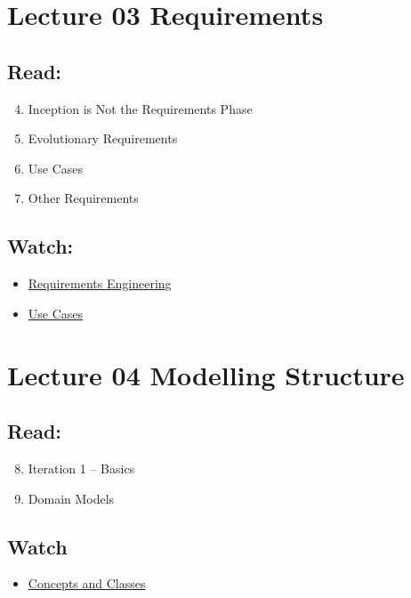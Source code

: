 \documentclass[10pt,t,a4paper]{article}
\begin{document}
\section{Lecture 03 Requirements}
\label{sec:orgheadline9}
\subsection{Read:}
\label{sec:orgheadline7}
\begin{enumerate}
\setcounter{enumi}{3}
\item Inception is Not the Requirements Phase
\item Evolutionary Requirements
\item Use Cases
\item Other Requirements
\end{enumerate}

\subsection{Watch:}
\label{sec:orgheadline8}
\begin{itemize}
\item \href{https://play.bth.se/media/Requirements+Engineering/1_epma2li8/41750261}{Requirements Engineering}
\item \href{https://play.bth.se/media/Use+Cases/1_d4tqygel/41750261}{Use Cases}
\end{itemize}
\section{Lecture 04 Modelling Structure}
\label{sec:orgheadline12}
\subsection{Read:}
\label{sec:orgheadline10}
\begin{enumerate}
\setcounter{enumi}{7}
\item Iteration 1 -- Basics
\item Domain Models
\end{enumerate}

\subsection{Watch}
\label{sec:orgheadline11}
\begin{itemize}
\item \href{https://play.bth.se/media/Concept+and+Classes/1_m237spjq/41750261}{Concepts and Classes}
\end{itemize}
\end{document}
